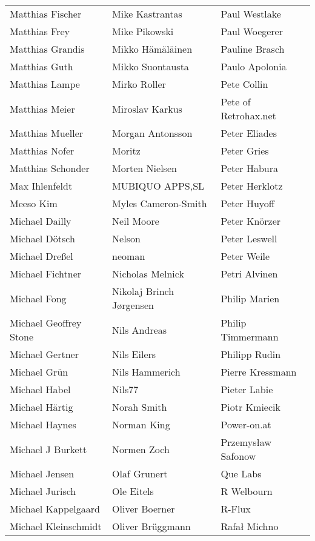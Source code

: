 \begin{small}
\begin{tabular}{p{4cm}p{4cm}p{4cm}}
\end{tabular}
\newpage
\setlength{\tabcolsep}{1mm}
\begin{tabular}{p{4cm}p{4cm}p{4cm}}
Matthias Fischer & Mike Kastrantas & Paul Westlake \\
Matthias Frey & Mike Pikowski & Paul Woegerer \\
Matthias Grandis & Mikko Hämäläinen & Pauline Brasch \\
Matthias Guth & Mikko Suontausta & Paulo Apolonia \\
Matthias Lampe & Mirko Roller & Pete Collin \\
Matthias Meier & Miroslav Karkus & Pete of Retrohax.net \\
Matthias Mueller & Morgan Antonsson & Peter Eliades \\
Matthias Nofer & Moritz & Peter Gries \\
Matthias Schonder & Morten Nielsen & Peter Habura \\
Max Ihlenfeldt & MUBIQUO APPS,SL & Peter Herklotz \\
Meeso Kim & Myles Cameron-Smith & Peter Huyoff \\
Michael Dailly & Neil Moore & Peter Knörzer \\
Michael Dötsch & Nelson & Peter Leswell \\
Michael Dreßel & neoman & Peter Weile \\
Michael Fichtner & Nicholas Melnick & Petri Alvinen \\
Michael Fong & Nikolaj Brinch Jørgensen & Philip Marien \\
Michael Geoffrey Stone & Nils Andreas & Philip Timmermann \\
Michael Gertner & Nils Eilers & Philipp Rudin \\
Michael Grün & Nils Hammerich & Pierre Kressmann \\
Michael Habel & Nils77 & Pieter Labie \\
Michael Härtig & Norah Smith & Piotr Kmiecik \\
Michael Haynes & Norman King & Power-on.at \\
Michael J Burkett & Normen Zoch & Przemysław Safonow \\
Michael Jensen & Olaf Grunert & Que Labs \\
Michael Jurisch & Ole Eitels & R Welbourn \\
Michael Kappelgaard & Oliver Boerner & R-Flux \\
Michael Kleinschmidt & Oliver Brüggmann & Rafał Michno \\

\end{tabular}
\end{small}
